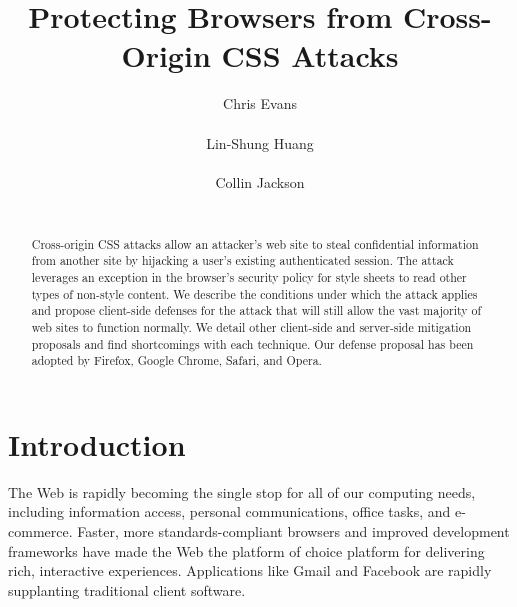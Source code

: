\documentclass{acm_proc_article-sp}
\begin{document}
\title{Protecting Browsers from Cross-Origin CSS Attacks}

\author{
\alignauthor
Chris Evans\\
      \\
\alignauthor
Lin-Shung Huang\\
      \\
\alignauthor
Collin Jackson\\
      \\
}

\newcommand{\todo}[1]{\textbf{[TODO: #1]}}

\maketitle
\begin{abstract}
Cross-origin CSS attacks allow an attacker's web site to steal confidential information from another site by hijacking a user's existing authenticated session. The attack leverages an exception in the browser's security policy for style sheets to read other types of non-style content. We describe the conditions under which the attack applies and propose client-side defenses for the attack that will still allow the vast majority of web sites to function normally. We detail other client-side and server-side mitigation proposals and find shortcomings with each technique. Our defense proposal has been adopted by Firefox, Google Chrome, Safari, and Opera.
\end{abstract}




\section{Introduction}

The Web is rapidly becoming the single stop for all of our computing needs,
including information access, personal communications, office tasks, and
e-commerce. Faster, more standards-compliant browsers and improved development
frameworks have made the Web the platform of choice platform for delivering
rich, interactive experiences. Applications like Gmail and Facebook are
rapidly supplanting traditional client software.
\end{document}
